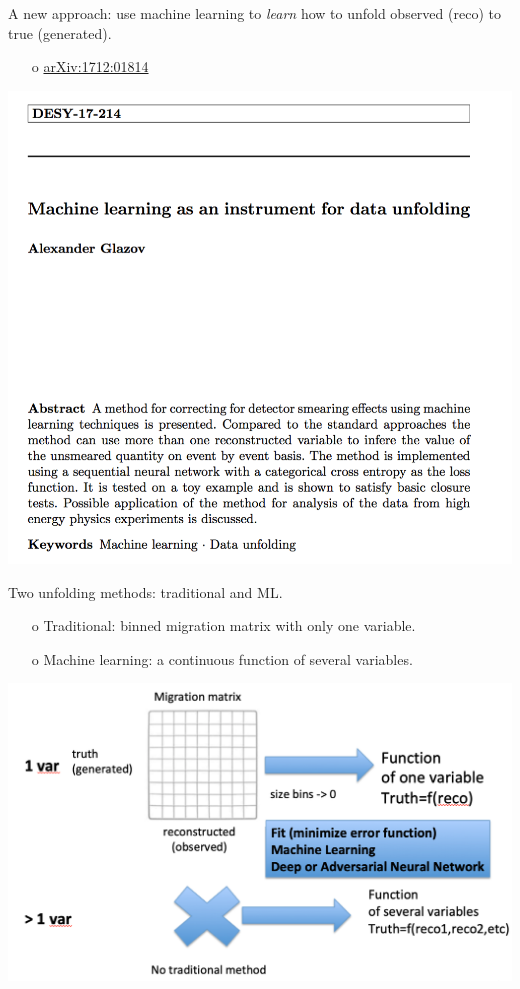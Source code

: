 \begin{frame}{A new approach: use machine learning to \emph{learn} how to unfold observed (reco) to true (generated).}
\begin{enumerate}
\item[o] \href{https://arxiv.org/pdf/1712.01814.pdf}{arXiv:1712:01814}
\end{enumerate}
\centering
\includegraphics[height=0.7\textheight]{./plots/PaperToyData.png}
\end{frame}
\clearpage

\begin{frame}{Two unfolding methods: traditional and ML.}
\begin{enumerate}
\item[o] Traditional: binned migration matrix with only one variable.
\item[o] Machine learning: a continuous function of several variables.
\end{enumerate}
\centering
\includegraphics[height=0.70\textheight]{./plots/Unfolding_Traditional_ML.png}
\end{frame}
\clearpage

